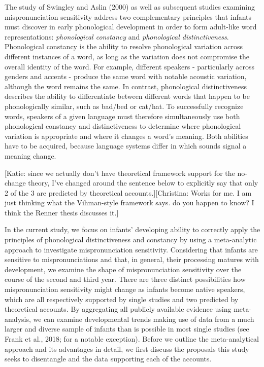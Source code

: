 \documentclass[man]{apa6}
\theoremstyle{definition}
\theoremstyle{definition}
\theoremstyle{definition}
\theoremstyle{remark}
\begin{document}
The study of Swingley and Aslin (2000) as well as subsequent studies
examining mispronunciation sensitivity address two complementary
principles that infants must discover in early phonological development
in order to form adult-like word representations: \emph{phonological
constancy} and \emph{phonological distinctiveness}. Phonological
constancy is the ability to resolve phonological variation across
different instances of a word, as long as the variation does not
compromise the overall identity of the word. For example, different
speakers - particularly across genders and accents - produce the same
word with notable acoustic variation, although the word remains the
same. In contrast, phonological distinctiveness describes the ability to
differentiate between different words that happen to be phonologically
similar, such as bad/bed or cat/hat. To successfully recognize words,
speakers of a given language must therefore simultaneously use both
phonological constancy and distinctiveness to determine where
phonological variation is appropriate and where it changes a word's
meaning. Both abilities have to be acquired, because language systems
differ in which sounds signal a meaning change.

{[}Katie: since we actually don't have theoretical framework support for
the no-change theory, I've changed around the sentence below to
explicitly say that only 2 of the 3 are predicted by theoretical
accounts.{]}{[}Christina: Works for me. I am just thinking what the
Vihman-style framework says. do you happen to know? I think the Renner
thesis discusses it.{]}

In the current study, we focus on infants' developing ability to
correctly apply the principles of phonological distinctiveness and
constancy by using a meta-analytic approach to investigate
mispronunciation sensitivity. Considering that infants are sensitive to
mispronunciations and that, in general, their processing matures with
development, we examine the shape of mispronunciation sensitivity over
the course of the second and third year. There are three distinct
possibilities how mispronunciation sensitivity might change as infants
become native speakers, which are all respectively supported by single
studies and two predicted by theoretical accounts. By aggregating all
publicly available evidence using meta-analysis, we can examine
developmental trends making use of data from a much larger and diverse
sample of infants than is possible in most single studies (see Frank et
al., 2018; for a notable exception). Before we outline the
meta-analytical approach and its advantages in detail, we first discuss
the proposals this study seeks to disentangle and the data supporting
each of the accounts.
\end{document}
